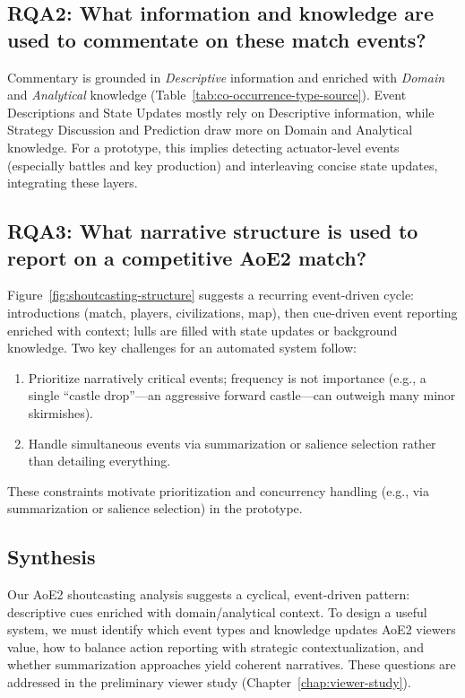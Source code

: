 \subsection{\textbf{RQA2:} What information and knowledge are used to commentate on these match events?}
Commentary is grounded in \textit{Descriptive} information and enriched with \textit{Domain} and \textit{Analytical} knowledge (Table~\ref{tab:co-occurrence-type-source}). Event Descriptions and State Updates mostly rely on Descriptive information, while Strategy Discussion and Prediction draw more on Domain and Analytical knowledge. For a prototype, this implies detecting actuator-level events (especially battles and key production) and interleaving concise state updates, integrating these layers.

\subsection{\textbf{RQA3:} What narrative structure is used to report on a competitive AoE2 match?}
Figure~\ref{fig:shoutcasting-structure} suggests a recurring event-driven cycle: introductions (match, players, civilizations, map), then cue-driven event reporting enriched with context; lulls are filled with state updates or background knowledge. Two key challenges for an automated system follow:
\begin{enumerate}[noitemsep, topsep=0pt]
  \item Prioritize narratively critical events; frequency is not importance (e.g., a single ``castle drop''---an aggressive forward castle---can outweigh many minor skirmishes).
  \item Handle simultaneous events via summarization or salience selection rather than detailing everything.
\end{enumerate}
These constraints motivate prioritization and concurrency handling (e.g., via summarization or salience selection) in the prototype.

\subsection{Synthesis}
Our AoE2 shoutcasting analysis suggests a cyclical, event-driven pattern: descriptive cues enriched with domain/analytical context. To design a useful system, we must identify which event types and knowledge updates AoE2 viewers value, how to balance action reporting with strategic contextualization, and whether summarization approaches yield coherent narratives. These questions are addressed in the preliminary viewer study (Chapter~\ref{chap:viewer-study}).

